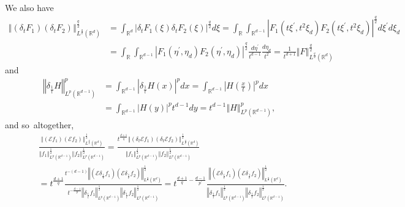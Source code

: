 \documentclass{amsart}%
\theoremstyle{plain}
\numberwithin{equation}{section}
\begin{document}
We also have%
\begin{align*}
\left\Vert \left(  \delta_{t}F_{1}\right)  \left(  \delta_{t}F_{2}\right)
\right\Vert _{L^{\frac{q}{2}}\left(  \mathbb{R}^{d}\right)  }^{\frac{q}{2}} &
=\int_{\mathbb{R}^{d}}\left\vert \delta_{t}F_{1}\left(  \xi\right)  \delta
_{t}F_{2}\left(  \xi\right)  \right\vert ^{\frac{q}{2}}d\xi=\int_{\mathbb{R}%
}\int_{\mathbb{R}^{d-1}}\left\vert F_{1}\left(  t\xi^{\prime},t^{2}\xi
_{d}\right)  F_{2}\left(  t\xi^{\prime},t^{2}\xi_{d}\right)  \right\vert
^{\frac{q}{2}}d\xi^{\prime}d\xi_{d}\\
&  =\int_{\mathbb{R}}\int_{\mathbb{R}^{d-1}}\left\vert F_{1}\left(
\eta^{\prime},\eta_{d}\right)  F_{2}\left(  \eta^{\prime},\eta_{d}\right)
\right\vert ^{\frac{q}{2}}\frac{d\eta^{\prime}}{t^{d-1}}\frac{d\eta_{d}}%
{t^{2}}=\frac{1}{t^{d+1}}\left\Vert F\right\Vert _{L^{\frac{q}{2}}\left(
\mathbb{R}^{d}\right)  }^{\frac{q}{2}}%
\end{align*}
and%
\begin{align*}
\left\Vert \delta_{\frac{1}{t}}H\right\Vert _{L^{p}\left(  \mathbb{R}%
^{d-1}\right)  }^{p} &  =\int_{\mathbb{R}^{d-1}}\left\vert \delta_{\frac{1}%
{t}}H\left(  x\right)  \right\vert ^{p}dx=\int_{\mathbb{R}^{d-1}}\left\vert
H\left(  \frac{x}{t}\right)  \right\vert ^{p}dx\\
&  =\int_{\mathbb{R}^{d-1}}\left\vert H\left(  y\right)  \right\vert
^{p}t^{d-1}dy=t^{d-1}\left\Vert H\right\Vert _{L^{p}\left(  \mathbb{R}%
^{d-1}\right)  }^{p},
\end{align*}
and so\ altogether,%
\begin{align*}
& \frac{\left\Vert \left(  \mathcal{E}f_{1}\right)  \left(  \mathcal{E}%
f_{2}\right)  \right\Vert _{L^{\frac{q}{2}}\left(  \mathbb{R}^{d}\right)
}^{\frac{1}{2}}}{\left\Vert f_{1}\right\Vert _{L^{p}\left(  \mathbb{R}%
^{d-1}\right)  }^{\frac{1}{2}}\left\Vert f_{2}\right\Vert _{L^{p}\left(
\mathbb{R}^{d-1}\right)  }^{\frac{1}{2}}}=\frac{t^{\frac{d+1}{q}}\left\Vert
\left(  \delta_{t}\mathcal{E}f_{1}\right)  \left(  \delta_{t}\mathcal{E}%
f_{2}\right)  \right\Vert _{L^{\frac{q}{2}}\left(  \mathbb{R}^{d}\right)
}^{\frac{1}{2}}}{\left\Vert f_{1}\right\Vert _{L^{p}\left(  \mathbb{R}%
^{d-1}\right)  }^{\frac{1}{2}}\left\Vert f_{2}\right\Vert _{L^{p}\left(
\mathbb{R}^{d-1}\right)  }^{\frac{1}{2}}}\\
& =t^{\frac{d+1}{q}}\frac{t^{-\left(  d-1\right)  }\left\Vert \left(
\mathcal{E}\delta_{\frac{1}{t}}f_{1}\right)  \left(  \mathcal{E}\delta
_{\frac{1}{t}}f_{2}\right)  \right\Vert _{L^{\frac{q}{2}}\left(
\mathbb{R}^{d}\right)  }^{\frac{1}{2}}}{t^{-\frac{d-1}{p}}\left\Vert
\delta_{\frac{1}{t}}f_{1}\right\Vert _{L^{p}\left(  \mathbb{R}^{d-1}\right)
}^{\frac{1}{2}}\left\Vert \delta_{\frac{1}{t}}f_{2}\right\Vert _{L^{p}\left(
\mathbb{R}^{d-1}\right)  }^{\frac{1}{2}}}=t^{\frac{d+1}{q}-\frac
{d-1}{p^{\prime}}}\frac{\left\Vert \left(  \mathcal{E}\delta_{\frac{1}{t}%
}f_{1}\right)  \left(  \mathcal{E}\delta_{\frac{1}{t}}f_{2}\right)
\right\Vert _{L^{\frac{q}{2}}\left(  \mathbb{R}^{d}\right)  }^{\frac{1}{2}}%
}{\left\Vert \delta_{\frac{1}{t}}f_{1}\right\Vert _{L^{p}\left(
\mathbb{R}^{d-1}\right)  }^{\frac{1}{2}}\left\Vert \delta_{\frac{1}{t}}%
f_{2}\right\Vert _{L^{p}\left(  \mathbb{R}^{d-1}\right)  }^{\frac{1}{2}}}.
\end{align*}
\end{document}
